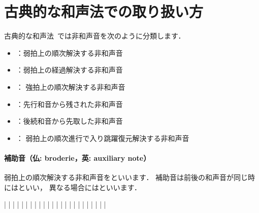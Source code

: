 \documentclass[dvipdfmx,uplatex,b5paper,openany,jbase=12Q,nomag*,textwidth-limit=44%
               ]{gachimuchi}[2020/05/05]
\begin{document}
\section{古典的な和声法での取り扱い方}
古典的な和声法~\cite{chSHIMOFUSA1,chSHIMOFUSA2,mgKIKUCHI1}では非和声音を次のように分類します．
\begin{itemize}
  \item {}：弱拍上の順次解決する非和声音
  \item {}：弱拍上の経過解決する非和声音
  \item {}：  強拍上の順次解決する非和声音
  \item {}：先行和音から残された非和声音
  \item {}：後続和音から先取した非和声音
  \item {}：  弱拍上の順次進行で入り跳躍復元解決する非和声音
\end{itemize}
\paragraph{補助音（仏: broderie，英: auxiliary note）}
弱拍上の順次解決する非和声音をといいます．
補助音は前後の和声音が同じ時にはといい，
異なる場合にはといいます．

\begin{Music}
  \generalmeter{\meterC}%
  \Startpiece%
  \NOtes%
  |\zchordsu{\Cross}%
  \en\NOTes%
  |%
  \en\doublebar%
  \NOtes%
  |\zchordsu{\Cross}%
  \en\NOTes%
  |%
  \en\doublebar%
  \NOtes%
  |\zchordsu{\Cross}%
  \en\NOTes%
  |%
  \en\doublebar%
  \NOtes%
  |\zchordsu{\Cross}%
  \en\NOTes%
  |%
  \en\doublebar%
  \NOtes%
  |\zchordsu{\Cross}%
  \en\NOTes%
  |%
  \en\doublebar%
  \NOtes%
  |\zchordsu{\Cross}%
  \en\NOTes%
  |%
  \en\setdoublebar%
  \endpiece%
  \generalmeter{\meterC}%
  \Startpiece%
  \NOtes%
  |\zchordsu{\Cross}%
  \en\NOTes%
  |%
  \en\doublebar%
  \NOtes%
  |\zchordsu{\Cross}%
  \en\NOTes%
  |%
  \en\doublebar%
  \NOtes%
  |\zchordsu{\Cross}%
  \en\NOTes%
  |%
  \en\doublebar%
  \NOtes%
  |\zchordsu{\Cross}%
  \en\NOTes%
  |%
  \en\doublebar%
  \NOtes%
  |\zchordsu{\Cross}%
  \en\NOTes%
  |%
  \en\doublebar%
  \NOtes%
  |\zchordsu{\Cross}%
  \en\NOTes%
  |%
  \en\setdoublebar%
  \endpiece%
\end{Music}
\end{document}
